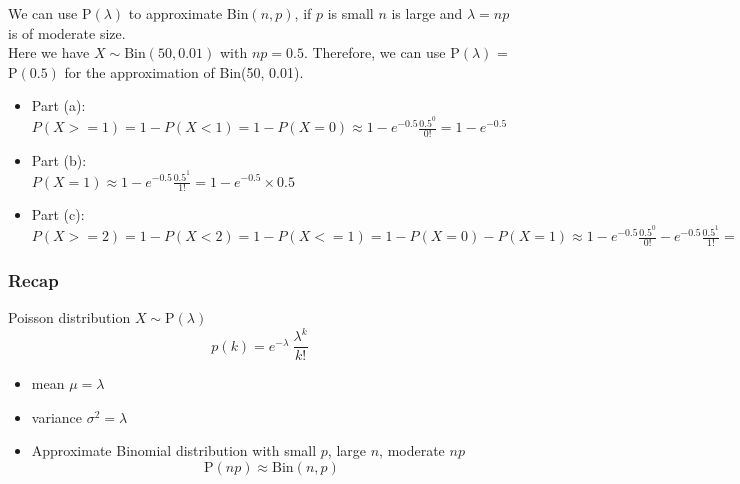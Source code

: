 \documentclass[slidestop,compress,mathserif]{beamer}
\begin{document}
\begin{frame}%

\pause
We can use P$(\lambda)$ to approximate Bin$(n, p)$, if $p$ is small $n$ is large and $\lambda = np$ is of moderate size.\\

Here we have $X \sim \textrm{Bin}(50, 0.01)$ with $np = 0.5$. Therefore, we can use P$(\lambda)$ = P$(0.5)$ for the approximation of Bin(50, 0.01). 

\begin{itemize}
\item Part (a): \\
$P(X >= 1) = 1 - P(X < 1) = 1 - P(X = 0) \approx 1 - e^{-0.5}\frac{0.5 ^ 0}{0!} = 1 - e^{-0.5}$\\

\item Part (b): \\
$P(X = 1) \approx 1 - e^{-0.5}\frac{0.5 ^ 1}{1!} = 1 - e^{-0.5} \times 0.5$

\item Part (c):\\
$P(X >= 2) = 1 - P(X < 2) = 1 - P(X <= 1) = 1 - P(X = 0) - P(X = 1) \approx 1 - e^{-0.5}\frac{0.5 ^ 0}{0!} - e^{-0.5}\frac{0.5 ^ 1}{1!} = 1 - e^{-0.5} \times 1.5$
\end{itemize}

\end{frame}


\begin{frame}\frametitle{Recap}

Poisson distribution $X \sim \text{P}(\lambda) $
\[ p(k) = e^{-\lambda}\ \frac{\lambda^k}{k!}\]
\begin{itemize}
\item mean $\mu = \lambda$
\item variance $\sigma^2 =  \lambda$
\item Approximate Binomial distribution with small $p$, large $n$, moderate $np$
\[ \text{P}(np) \approx \text{Bin}(n,p) \]
\end{itemize}


\end{frame}
\end{document}
